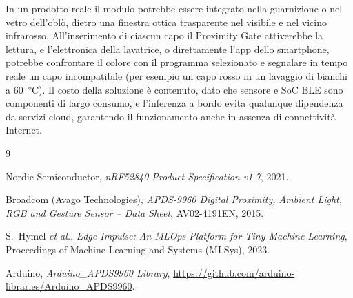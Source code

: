 \documentclass[11pt,a4paper,twoside,openany]{report}
\begin{document}
In un prodotto reale il modulo potrebbe essere integrato nella
guarnizione o nel vetro dell'oblò, dietro una finestra ottica
trasparente nel visibile e nel vicino infrarosso. All'inserimento di
ciascun capo il Proximity Gate attiverebbe la lettura, e l'elettronica
della lavatrice, o direttamente l'app dello smartphone, potrebbe
confrontare il colore con il programma selezionato e segnalare in tempo
reale un capo incompatibile (per esempio un capo rosso in un lavaggio
di bianchi a \SI{60}{\celsius}). Il costo della soluzione è contenuto,
dato che sensore e SoC BLE sono componenti di largo consumo, e
l'inferenza a bordo evita qualunque dipendenza da servizi cloud,
garantendo il funzionamento anche in assenza di connettività Internet.


\begin{thebibliography}{9}

Nordic Semiconductor,
\textit{nRF52840 Product Specification v1.7}, 2021.

Broadcom (Avago Technologies),
\textit{APDS-9960 Digital Proximity, Ambient Light, RGB and Gesture
Sensor -- Data Sheet}, AV02-4191EN, 2015.

S.~Hymel \textit{et al.},
\textit{Edge Impulse: An MLOps Platform for Tiny Machine Learning},
Proceedings of Machine Learning and Systems (MLSys), 2023.

Arduino,
\textit{Arduino\_APDS9960 Library},
\url{https://github.com/arduino-libraries/Arduino_APDS9960}.

\end{thebibliography}
\end{document}
